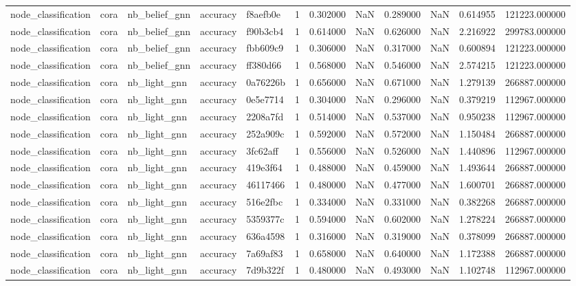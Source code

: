 \begin{tabular}{lllllrrrrrrr}
node_classification & cora & nb_belief_gnn & accuracy & f8aefb0e & 1 & 0.302000 & NaN & 0.289000 & NaN & 0.614955 & 121223.000000 \\
node_classification & cora & nb_belief_gnn & accuracy & f90b3cb4 & 1 & 0.614000 & NaN & 0.626000 & NaN & 2.216922 & 299783.000000 \\
node_classification & cora & nb_belief_gnn & accuracy & fbb609c9 & 1 & 0.306000 & NaN & 0.317000 & NaN & 0.600894 & 121223.000000 \\
node_classification & cora & nb_belief_gnn & accuracy & ff380d66 & 1 & 0.568000 & NaN & 0.546000 & NaN & 2.574215 & 121223.000000 \\
node_classification & cora & nb_light_gnn & accuracy & 0a76226b & 1 & 0.656000 & NaN & 0.671000 & NaN & 1.279139 & 266887.000000 \\
node_classification & cora & nb_light_gnn & accuracy & 0e5e7714 & 1 & 0.304000 & NaN & 0.296000 & NaN & 0.379219 & 112967.000000 \\
node_classification & cora & nb_light_gnn & accuracy & 2208a7fd & 1 & 0.514000 & NaN & 0.537000 & NaN & 0.950238 & 112967.000000 \\
node_classification & cora & nb_light_gnn & accuracy & 252a909c & 1 & 0.592000 & NaN & 0.572000 & NaN & 1.150484 & 266887.000000 \\
node_classification & cora & nb_light_gnn & accuracy & 3fc62aff & 1 & 0.556000 & NaN & 0.526000 & NaN & 1.440896 & 112967.000000 \\
node_classification & cora & nb_light_gnn & accuracy & 419e3f64 & 1 & 0.488000 & NaN & 0.459000 & NaN & 1.493644 & 266887.000000 \\
node_classification & cora & nb_light_gnn & accuracy & 46117466 & 1 & 0.480000 & NaN & 0.477000 & NaN & 1.600701 & 266887.000000 \\
node_classification & cora & nb_light_gnn & accuracy & 516e2fbc & 1 & 0.334000 & NaN & 0.331000 & NaN & 0.382268 & 266887.000000 \\
node_classification & cora & nb_light_gnn & accuracy & 5359377c & 1 & 0.594000 & NaN & 0.602000 & NaN & 1.278224 & 266887.000000 \\
node_classification & cora & nb_light_gnn & accuracy & 636a4598 & 1 & 0.316000 & NaN & 0.319000 & NaN & 0.378099 & 266887.000000 \\
node_classification & cora & nb_light_gnn & accuracy & 7a69af83 & 1 & 0.658000 & NaN & 0.640000 & NaN & 1.172388 & 266887.000000 \\
node_classification & cora & nb_light_gnn & accuracy & 7d9b322f & 1 & 0.480000 & NaN & 0.493000 & NaN & 1.102748 & 112967.000000 \\

\end{tabular}
